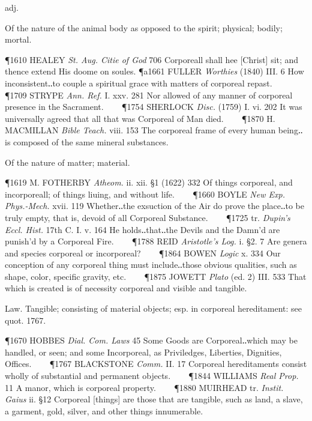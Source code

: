 \begin{description}[wide, labelwidth=!, labelindent=0pt]
\begin{myenumerate}

 adj.

 Of the nature of the animal body as opposed to the spirit; physical; bodily; mortal.

\P 1610 HEALEY  \textit{St. Aug. Citie of God} 706 Corporeall shall hee [Christ] sit; and thence extend His doome on soules.
\P a1661 FULLER  \textit{Worthies} (1840) III. 6 How inconsistent‥to couple a spiritual grace with matters of corporeal repast.    
\P 1709 STRYPE  \textit{Ann. Ref.} I. xxv. 281 Nor allowed of any manner of corporeal presence in the Sacrament.    
\P 1754 SHERLOCK  \textit{Disc.} (1759) I. vi. 202 It was universally agreed that all that was Corporeal of Man died.    
\P 1870 H. MACMILLAN  \textit{Bible Teach.} viii. 153 The corporeal frame of every human being‥is composed of the same mineral substances.

 Of the nature of matter; material.

\P 1619 M. FOTHERBY  \textit{Atheom.} ii. xii. §1 (1622) 332 Of things corporeal, and incorporeall; of things liuing, and without life.    
\P 1660 BOYLE  \textit{New Exp. Phys.-Mech.} xvii. 119 Whether‥the exsuction of the Air do prove the place‥to be truly empty, that is, devoid of all Corporeal Substance.    
\P 1725 tr.  \textit{Dupin's Eccl. Hist.} 17th C. I. v. 164 He holds‥that‥the Devils and the Damn'd are punish'd by a Corporeal Fire.    
\P 1788 REID  \textit{Aristotle's Log.} i. §2. 7 Are genera and species corporeal or incorporeal?    
\P 1864 BOWEN  \textit{Logic} x. 334 Our conception of any corporeal thing must include‥those obvious qualities, such as shape, color, specific gravity, etc.    
\P 1875 JOWETT  \textit{Plato} (ed. 2) III. 533 That which is created is of necessity corporeal and visible and tangible.

 Law. Tangible; consisting of material objects; esp. in corporeal hereditament: see quot. 1767.

\P 1670 HOBBES  \textit{Dial. Com. Laws} 45 Some Goods are Corporeal‥which may be handled, or seen; and some Incorporeal, as Priviledges, Liberties, Dignities, Offices.    
\P 1767 BLACKSTONE  \textit{Comm.} II. 17 Corporeal hereditaments consist wholly of substantial and permanent objects.    
\P 1844 WILLIAMS  \textit{Real Prop.} 11 A manor, which is corporeal property.    
\P 1880 MUIRHEAD tr.  \textit{Instit. Gaius} ii. §12 Corporeal [things] are those that are tangible, such as land, a slave, a garment, gold, silver, and other things innumerable.


\end{myenumerate}
\end{description}
